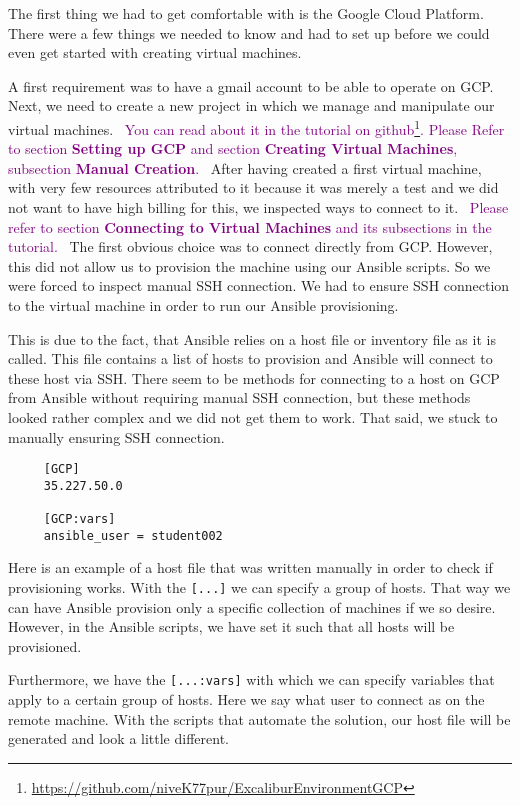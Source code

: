 The first thing we had to get comfortable with is the Google Cloud
Platform. There were a few things we needed to know and had to set up
before we could even get started with creating virtual machines.

A first requirement was to have a gmail account to be able to operate
on GCP. Next, we need to create a new project in which we manage and
manipulate our virtual machines.
\
\textcolor{purple}{You can read about it in the tutorial on
github\footnote{\url{https://github.com/niveK77pur/ExcaliburEnvironmentGCP}}.
Please Refer to section \textbf{Setting up GCP} and section
\textbf{Creating Virtual Machines}, subsection \textbf{Manual
Creation}.}
\
After having created a first virtual machine, with very few resources
attributed to it because it was merely a test and we did not want to
have high billing for this, we inspected ways to connect to it.
\
\textcolor{purple}{Please refer to section \textbf{Connecting to
Virtual Machines} and its subsections in the tutorial.}
\
The first obvious choice was to connect directly from GCP. However,
this did not allow us to provision the machine using our Ansible
scripts. So we were forced to inspect manual SSH connection. We had to
ensure SSH connection to the virtual machine in order to run our
Ansible provisioning. 

This is due to the fact, that Ansible relies on a host file or
inventory file as it is called. This file contains a list of hosts to
provision and Ansible will connect to these host via SSH. There seem
to be methods for connecting to a host on GCP from Ansible without
requiring manual SSH connection, but these methods looked rather
complex and we did not get them to work. That said, we stuck to
manually ensuring SSH connection.

\begin{verbatim}
	 [GCP]
	 35.227.50.0

	 [GCP:vars]
	 ansible_user = student002
\end{verbatim}

Here is an example of a host file that was written manually in order
to check if provisioning works. With the \verb|[...]| we can specify a
group of hosts. That way we can have Ansible provision only a specific
collection of machines if we so desire. However, in the Ansible
scripts, we have set it such that all hosts will be provisioned.

Furthermore, we have the \verb|[...:vars]| with which we can specify
variables that apply to a certain group of hosts. Here we say what
user to connect as on the remote machine. With the scripts that
automate the solution, our host file will be generated and look a
little different.

